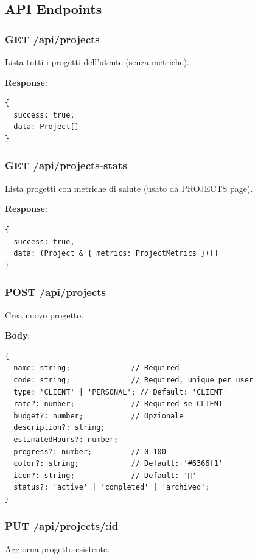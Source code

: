 \documentclass[11pt,a4paper]{article}
\begin{document}
\subsection{API Endpoints}

\subsubsection{GET /api/projects}

Lista tutti i progetti dell'utente (senza metriche).

\textbf{Response}:
\begin{lstlisting}
{
  success: true,
  data: Project[]
}
\end{lstlisting}

\subsubsection{GET /api/projects-stats}

Lista progetti con metriche di salute (usato da PROJECTS page).

\textbf{Response}:
\begin{lstlisting}
{
  success: true,
  data: (Project & { metrics: ProjectMetrics })[]
}
\end{lstlisting}

\subsubsection{POST /api/projects}

Crea nuovo progetto.

\textbf{Body}:
\begin{lstlisting}
{
  name: string;              // Required
  code: string;              // Required, unique per user
  type: 'CLIENT' | 'PERSONAL'; // Default: 'CLIENT'
  rate?: number;             // Required se CLIENT
  budget?: number;           // Opzionale
  description?: string;
  estimatedHours?: number;
  progress?: number;         // 0-100
  color?: string;            // Default: '#6366f1'
  icon?: string;             // Default: '📂'
  status?: 'active' | 'completed' | 'archived';
}
\end{lstlisting}

\subsubsection{PUT /api/projects/:id}

Aggiorna progetto esistente.
\end{document}
